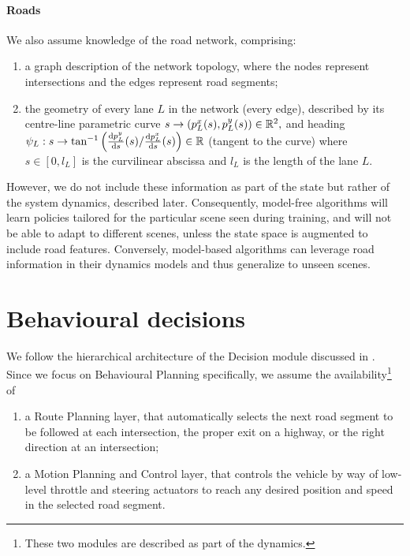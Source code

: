 \paragraph{Roads}

We also assume knowledge of the road network, comprising:
\begin{enumerate}[label=(\roman*)]
	\item a graph description of the network topology, where the nodes represent intersections and the edges represent road segments;
	\item the geometry of every lane $L$ in the network (every edge), described by its centre-line parametric curve
	$
	s \rightarrow (p^x_{L}(s), p^y_{L}(s))\in \mathbb{R}^2,
	$
	\noindent and heading $\psi_L:s \rightarrow \tan^{-1}\left({\odv{p^y_{L}}{s}(s)}/{\odv{p^x_{L}}{s}(s)}\right) \in \Real$
	(tangent to the curve) where $s\in[0, l_L]$ is the curvilinear abscissa and $l_L$ is the length of the lane $L$.
\end{enumerate}

However, we do not include these information as part of the state but rather of the system dynamics, described later. Consequently, \gls{model-free} algorithms will learn policies tailored for the particular scene seen during training, and will not be able to adapt to different scenes, unless the state space is augmented to include road features. Conversely, \gls{model-based} algorithms can leverage road information in their dynamics models and thus generalize to unseen scenes.

\section{Behavioural decisions}

We follow the hierarchical architecture of the Decision module discussed in . Since we focus on Behavioural Planning specifically, we assume the availability\footnote{These two modules are described as part of the dynamics.} of
\begin{enumerate}[label=(\roman*)]
	\item a Route Planning layer, that automatically selects the next road segment to be followed at each intersection, \eg the proper exit on a highway, or the right direction at an intersection;
	\item a Motion Planning and Control layer, that controls the vehicle by way of low-level throttle and steering actuators to reach any desired position and speed in the selected road segment. 
\end{enumerate}

